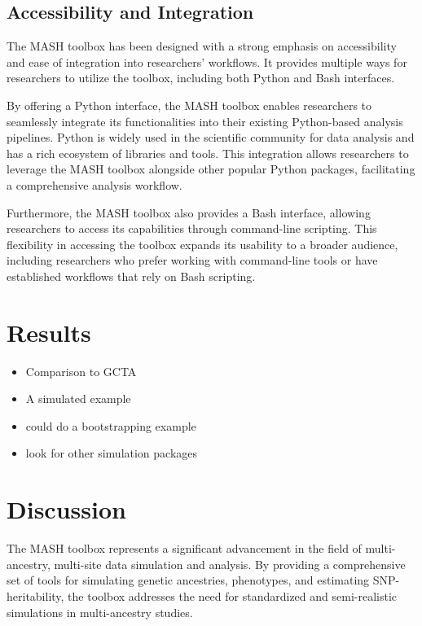 \documentclass[sn-nature]{sn-jnl}%
\begin{document}
\subsection{Accessibility and Integration}
The MASH toolbox has been designed with a strong emphasis on accessibility and ease of integration into researchers' workflows. It provides multiple ways for researchers to utilize the toolbox, including both Python and Bash interfaces.

By offering a Python interface, the MASH toolbox enables researchers to seamlessly integrate its functionalities into their existing Python-based analysis pipelines. Python is widely used in the scientific community for data analysis and has a rich ecosystem of libraries and tools. This integration allows researchers to leverage the MASH toolbox alongside other popular Python packages, facilitating a comprehensive analysis workflow.

Furthermore, the MASH toolbox also provides a Bash interface, allowing researchers to access its capabilities through command-line scripting. This flexibility in accessing the toolbox expands its usability to a broader audience, including researchers who prefer working with command-line tools or have established workflows that rely on Bash scripting.

\section{Results}\label{sec:results}
\begin{itemize}
  \item Comparison to GCTA
  \item A simulated example
  \item could do a bootstrapping example
  \item look for other simulation packages
\end{itemize}

\section{Discussion}\label{sec:discussion}

The MASH toolbox represents a significant advancement in the field of multi-ancestry, multi-site data simulation and analysis. By providing a comprehensive set of tools for simulating genetic ancestries, phenotypes, and estimating SNP-heritability, the toolbox addresses the need for standardized and semi-realistic simulations in multi-ancestry studies.
\end{document}
